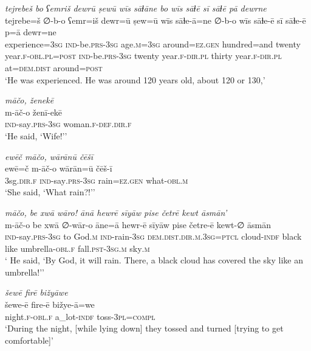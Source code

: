 \ea \label{ZB.12}
\textit{tejrebeš bo ʕemriš dewrū ṣewū wīs sāɫāne bo wīs sāɫē sī sāɫē pā dewrne} \\ 
\gll tejrebe=š ∅-b-o ʕemr=iš dewr=ū ṣew=ū wīs sāɫe-ā=ne ∅-b-o wīs sāɫe-ē sī sāɫe-ē p=ā dewr=ne \\ 
 experience\textsc{=3sg} \textsc{ind-}be\textsc{.prs}\textsc{-3sg} age\textsc{.m}\textsc{=3sg} around\textsc{\textsc{=ez.gen}} hundred=and twenty year\textsc{.f}\textsc{-obl}\textsc{.pl}\textsc{=\textsc{post}} \textsc{ind-}be\textsc{.prs}\textsc{-3sg} twenty year\textsc{.f}\textsc{-dir}\textsc{.pl} thirty year\textsc{.f}\textsc{-dir}\textsc{.pl} at=\textsc{dem.dist} around\textsc{=\textsc{post}} \\ 
\glt `He was experienced. He was around 120 years old, about 120 or 130,'
\z 
 
\ea \label{ZB.13}
\textit{māčo, ženekē} \\ 
\gll m-āč-o ženī-ekē \\ 
 \textsc{ind-}say\textsc{.prs}\textsc{-3sg} woman\textsc{.f}\textsc{-def}\textsc{.dir}\textsc{.f} \\ 
\glt `He said, ‘Wife!’'
\z 
 
\ea \label{ZB.16}
\textit{ewēč māčo, wārānū čēšī} \\ 
\gll ewē=č m-āč-o wārān=ū čēš-ī \\ 
 3sg\textsc{.dir}\textsc{.f} \textsc{ind-}say\textsc{.prs}\textsc{-3sg} rain\textsc{\textsc{=ez.gen}} what\textsc{-obl}\textsc{.m} \\ 
\glt `She said, ‘What rain?!’'
\z 
 
\ea \label{ZB.17}
\textit{māčo, be xwā wāro! ānā hewrē sīyāw pise četrē kewt āsmān’} \\ 
\gll m-āč-o be xwā ∅-wār-o āne=ā hewr-ē sīyāw pise četre-ē kewt-∅ āsmān \\ 
 \textsc{ind-}say\textsc{.prs}\textsc{-3sg} to God\textsc{.m} \textsc{ind-}rain\textsc{-3sg} \textsc{dem.dist}\textsc{.dir}\textsc{.m}\textsc{.3sg}=\textsc{ptcl} cloud\textsc{-indf} black like umbrella\textsc{-obl}\textsc{.f} fall\textsc{.pst}\textsc{-3sg}\textsc{.m} sky\textsc{.m} \\ 
\glt ` He said, ‘By God, it will rain. There, a black cloud has covered the sky like an umbrella!’'
\z 
 
\ea \label{ZB.18}
\textit{šewē firē bižyāwe} \\ 
\gll šewe-ē fire-ē bižye-ā=we \\ 
 night\textsc{.f}\textsc{-obl}\textsc{.f} a\_lot\textsc{-indf} toss\textsc{-3pl}\textsc{=compl} \\ 
\glt `During the night, [while lying down] they tossed and turned [trying to get comfortable]'
\z 
 
